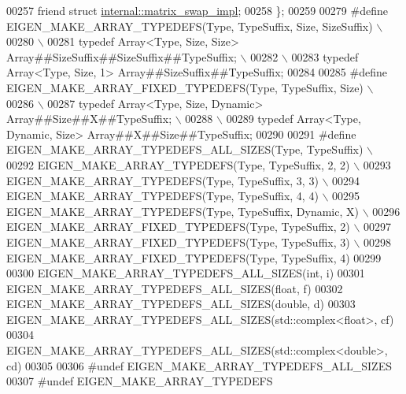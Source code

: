 \begin{DoxyCode}
00257     \textcolor{keyword}{friend} \textcolor{keyword}{struct }\hyperlink{struct_eigen_1_1internal_1_1matrix__swap__impl}{internal::matrix\_swap\_impl};
00258 \};
00259 
00279 \textcolor{preprocessor}{#define EIGEN\_MAKE\_ARRAY\_TYPEDEFS(Type, TypeSuffix, Size, SizeSuffix)   \(\backslash\)}
00280 \textcolor{preprocessor}{                                    \(\backslash\)}
00281 \textcolor{preprocessor}{typedef Array<Type, Size, Size> Array##SizeSuffix##SizeSuffix##TypeSuffix;  \(\backslash\)}
00282 \textcolor{preprocessor}{                                    \(\backslash\)}
00283 \textcolor{preprocessor}{typedef Array<Type, Size, 1>    Array##SizeSuffix##TypeSuffix;}
00284 
00285 \textcolor{preprocessor}{#define EIGEN\_MAKE\_ARRAY\_FIXED\_TYPEDEFS(Type, TypeSuffix, Size)         \(\backslash\)}
00286 \textcolor{preprocessor}{                                    \(\backslash\)}
00287 \textcolor{preprocessor}{typedef Array<Type, Size, Dynamic> Array##Size##X##TypeSuffix;  \(\backslash\)}
00288 \textcolor{preprocessor}{                                    \(\backslash\)}
00289 \textcolor{preprocessor}{typedef Array<Type, Dynamic, Size> Array##X##Size##TypeSuffix;}
00290 
00291 \textcolor{preprocessor}{#define EIGEN\_MAKE\_ARRAY\_TYPEDEFS\_ALL\_SIZES(Type, TypeSuffix) \(\backslash\)}
00292 \textcolor{preprocessor}{EIGEN\_MAKE\_ARRAY\_TYPEDEFS(Type, TypeSuffix, 2, 2) \(\backslash\)}
00293 \textcolor{preprocessor}{EIGEN\_MAKE\_ARRAY\_TYPEDEFS(Type, TypeSuffix, 3, 3) \(\backslash\)}
00294 \textcolor{preprocessor}{EIGEN\_MAKE\_ARRAY\_TYPEDEFS(Type, TypeSuffix, 4, 4) \(\backslash\)}
00295 \textcolor{preprocessor}{EIGEN\_MAKE\_ARRAY\_TYPEDEFS(Type, TypeSuffix, Dynamic, X) \(\backslash\)}
00296 \textcolor{preprocessor}{EIGEN\_MAKE\_ARRAY\_FIXED\_TYPEDEFS(Type, TypeSuffix, 2) \(\backslash\)}
00297 \textcolor{preprocessor}{EIGEN\_MAKE\_ARRAY\_FIXED\_TYPEDEFS(Type, TypeSuffix, 3) \(\backslash\)}
00298 \textcolor{preprocessor}{EIGEN\_MAKE\_ARRAY\_FIXED\_TYPEDEFS(Type, TypeSuffix, 4)}
00299 
00300 EIGEN\_MAKE\_ARRAY\_TYPEDEFS\_ALL\_SIZES(\textcolor{keywordtype}{int},                  i)
00301 EIGEN\_MAKE\_ARRAY\_TYPEDEFS\_ALL\_SIZES(\textcolor{keywordtype}{float},                f)
00302 EIGEN\_MAKE\_ARRAY\_TYPEDEFS\_ALL\_SIZES(\textcolor{keywordtype}{double},               d)
00303 EIGEN\_MAKE\_ARRAY\_TYPEDEFS\_ALL\_SIZES(std::complex<float>,  cf)
00304 EIGEN\_MAKE\_ARRAY\_TYPEDEFS\_ALL\_SIZES(std::complex<double>, cd)
00305 
00306 \textcolor{preprocessor}{#undef EIGEN\_MAKE\_ARRAY\_TYPEDEFS\_ALL\_SIZES}
00307 \textcolor{preprocessor}{#undef EIGEN\_MAKE\_ARRAY\_TYPEDEFS}

\end{DoxyCode}
